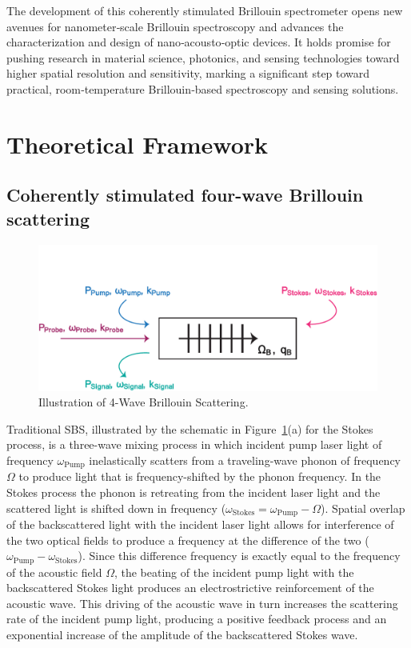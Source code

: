 The development of this coherently stimulated Brillouin spectrometer opens new avenues for nanometer‐scale Brillouin spectroscopy and advances the characterization and design of nano‐acousto‐optic devices. It holds promise for pushing research in material science, photonics, and sensing technologies toward higher spatial resolution and sensitivity, marking a significant step toward practical, room‐temperature Brillouin‐based spectroscopy and sensing solutions.

\section{Theoretical Framework}
\label{Theoretical Framework}

\subsection{Coherently stimulated four-wave Brillouin scattering}
\label{Theoretical Framework:Coherently stimulated five-wave Brillouin scattering}

\begin{figure}[t]
  \centering
  \includegraphics[width=\textwidth]{figs/4-CABS/4-Wave-Brillouin-Scattering.pdf}
  \caption{Illustration of 4-Wave Brillouin Scattering.}
  \label{fig:4-Wave-Brillouin-Scattering}
\end{figure}

Traditional SBS, illustrated by the schematic in Figure~\ref{fig:4-Wave-Brillouin-Scattering}(a) for the Stokes process, is a three-wave mixing process in which incident pump laser light of frequency \(\omega_{\mathrm{Pump}}\) inelastically scatters from a traveling-wave phonon of frequency \(\Omega\) to produce light that is frequency-shifted by the phonon frequency. In the Stokes process the phonon is retreating from the incident laser light and the scattered light is shifted down in frequency (\(\omega_{\mathrm{Stokes}} = \omega_{\mathrm{Pump}} - \Omega\)). Spatial overlap of the backscattered light with the incident laser light allows for interference of the two optical fields to produce a frequency at the difference of the two (\(\omega_{\mathrm{Pump}} - \omega_{\mathrm{Stokes}}\)). Since this difference frequency is exactly equal to the frequency of the acoustic field \(\Omega\), the beating of the incident pump light with the backscattered Stokes light produces an electrostrictive reinforcement of the acoustic wave. This driving of the acoustic wave in turn increases the scattering rate of the incident pump light, producing a positive feedback process and an exponential increase of the amplitude of the backscattered Stokes wave.

